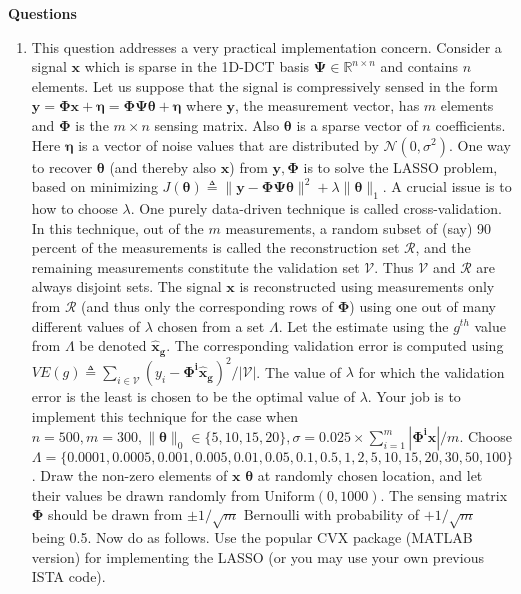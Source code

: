 \documentclass[11pt]{article}
\begin{document}
\newpage
\noindent\textbf{Questions}
\begin{enumerate}
\item This question addresses a very practical implementation concern. Consider a signal $\boldsymbol{x}$ which is sparse in the 1D-DCT basis $\boldsymbol{\Psi} \in \mathbb{R}^{n \times n}$ and contains $n$ elements. Let us suppose that the signal is compressively sensed in the form $\boldsymbol{y} = \boldsymbol{\Phi x} + \boldsymbol{\eta} = \boldsymbol{\Phi \Psi \theta} + \boldsymbol{\eta}$ where $\boldsymbol{y}$, the measurement vector, has $m$ elements and $\boldsymbol{\Phi}$ is the $m \times n$ sensing matrix. Also $\boldsymbol{\theta}$ is a sparse vector of $n$ coefficients. Here $\boldsymbol{\eta}$ is a vector of noise values that are distributed by $\mathcal{N}(0,\sigma^2)$.  One way to recover $\boldsymbol{\theta}$ (and thereby also $\boldsymbol{x}$) from $\boldsymbol{y}, \boldsymbol{\Phi}$ is to solve the LASSO problem, based on minimizing $J(\boldsymbol{\theta}) \triangleq \|\boldsymbol{y}-\boldsymbol{\Phi \Psi \theta}\|^2 + \lambda \|\boldsymbol{\theta}\|_1$. A crucial issue is to how to choose $\lambda$. One purely data-driven technique is called cross-validation. In this technique, out of the $m$ measurements, a random subset of (say) 90 percent of the measurements is called the reconstruction set $\mathcal{R}$, and the remaining measurements constitute the validation set $\mathcal{V}$. Thus $\mathcal{V}$ and $\mathcal{R}$ are always disjoint sets. The signal $\boldsymbol{x}$ is reconstructed using measurements only from $\mathcal{R}$ (and thus only the corresponding rows of $\boldsymbol{\Phi}$) using one out of many different values of $\lambda$ chosen from a set $\Lambda$. Let the estimate using the $g^{th}$ value from $\Lambda$ be denoted $\boldsymbol{\hat{x}_g}$. The corresponding validation error is computed using $VE(g) \triangleq \sum_{i \in \mathcal{V}} (y_i - \boldsymbol{\Phi^i \hat{x}_g})^2/|\mathcal{V}|$. The value of $\lambda$ for which the validation error is the least is chosen to be the optimal value of $\lambda$. Your job is to implement this technique for the case when $n = 500, m = 300, \|\boldsymbol{\theta}\|_0 \in \{5,10,15,20\}, \sigma = 0.025 \times \sum_{i=1}^m |\boldsymbol{\Phi^i x}| / m$. Choose $\Lambda = \{0.0001, 0.0005, 0.001, 0.005, 0.01, 0.05, 0.1, 0.5, 1, 2, 5, 10, 15, 20, 30, 50, 100\}$. Draw the non-zero elements of \sout{$\boldsymbol{x}$} $\boldsymbol{\theta}$ at randomly chosen location, and let their values be drawn randomly from $\textrm{Uniform}(0,1000)$. The sensing matrix $\boldsymbol{\Phi}$ should be drawn from $\pm 1/\sqrt{m} \textrm{ Bernoulli}$ with probability of $+1/\sqrt{m}$ being 0.5. Now do as follows. Use the popular CVX package (MATLAB version)  for implementing the LASSO (or you may use your own previous ISTA code). 


\end{enumerate}
\end{document}
